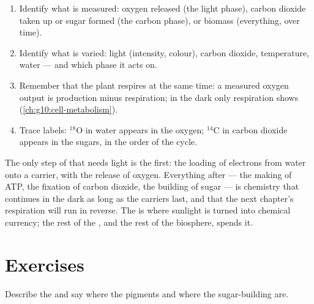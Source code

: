 \begin{method}\label{met:g12:photosynthesis:experiment}
\begin{enumerate}
  \item Identify what is measured: oxygen released (the light phase),
        carbon dioxide taken up or sugar formed (the carbon phase), or
        biomass (everything, over time).
  \item Identify what is varied: light (intensity, colour), carbon
        dioxide, temperature, water --- and which phase it acts on.
  \item Remember that the plant respires at the same time: a
        measured oxygen output is production minus respiration; in the
        dark only respiration shows (\cref{ch:g10:cell-metabolism}).
  \item Trace labels: $^{18}$O in water appears in the oxygen; $^{14}$C
        in carbon dioxide appears in the sugars, in the order of the
        cycle.
\end{enumerate}
\end{method}

\begin{remark}\label{rem:g12:photosynthesis:light}
The only step of  that needs light is the first: the
loading of electrons from water onto a carrier, with the release of
oxygen. Everything after --- the making of ATP, the fixation of carbon
dioxide, the building of sugar --- is chemistry that continues in the
dark as long as the carriers last, and that the next chapter's
respiration will run in reverse. The  is where sunlight is
turned into chemical currency; the rest of the , and the rest of
the biosphere, spends it.
\end{remark}

\section{Exercises}

\begin{exercise}[$\star$]\label{exo:g12:photosynthesis:1}
Describe the  and say where the pigments and where the
sugar-building  are.
\end{exercise}

